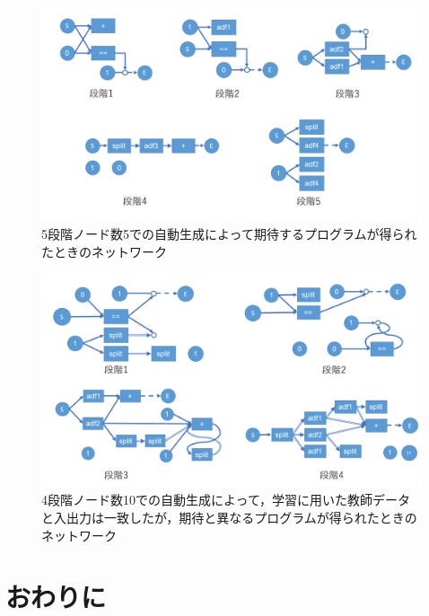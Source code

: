 \documentclass[exploratorypaper]{jsaiart} %
\begin{document}
\begin{figure}[t]
    \begin{center}
        \includegraphics[width=150mm]{out_net_p5n5.png}
    \end{center}
    \capwidth=90mm %
    \caption{5段階ノード数5での自動生成によって期待するプログラムが得られたときのネットワーク}
    \label{fig:out_net_p5n5}
\end{figure}

\begin{figure}[t]
    \begin{center}
        \includegraphics[width=150mm]{out_net_p4n10.png}
    \end{center}
    \capwidth=90mm %
    \caption{4段階ノード数10での自動生成によって，学習に用いた教師データと入出力は一致したが，期待と異なるプログラムが得られたときのネットワーク}
    \label{fig:out_net_p4n10}
\end{figure}

\section{おわりに}
\end{document}
